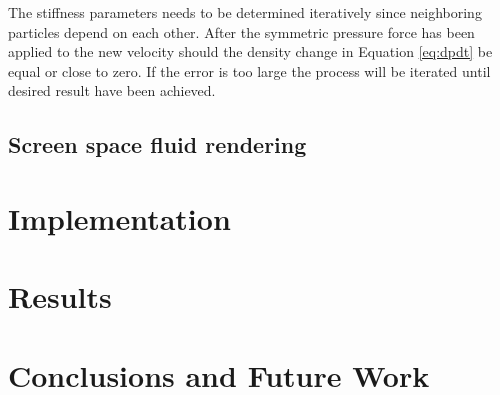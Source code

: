     The stiffness parameters needs to be determined iteratively since neighboring particles depend on each other. After the symmetric pressure force has been applied to the new velocity should the density change in Equation \ref{eq:dpdt} be equal or close to zero. If the error is too large the process will be iterated until desired result have been achieved.


\subsection{Screen space fluid rendering}

\section{Implementation}
 

\section{Results}



\section{Conclusions and Future Work}






